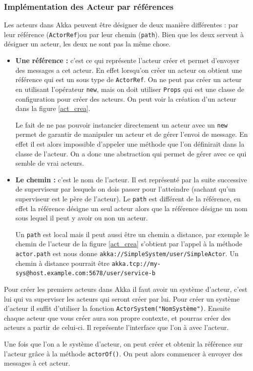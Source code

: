 \documentclass[11pt, a4paper]{article}
\begin{document}
\subsubsection{Implémentation des Acteur par références}
Les acteurs dans Akka peuvent être désigner de deux manière différentes : par leur référence (\texttt{ActorRef})ou par leur chemin (\texttt{path}). Bien que les deux servent à désigner un acteur, les deux ne sont pas la même chose. 
\begin{itemize}
\item \textbf{Une référence :} c'est ce qui représente l'acteur créer et permet d'envoyer des messages a cet acteur. En effet lorsqu'on créer un acteur on obtient une référence qui est un sous type de \texttt{ActorRef}. On ne peut pas créer un acteur en utilisant l'opérateur \texttt{new}, mais on doit utiliser \texttt{Props} qui est une classe de configuration pour créer des acteurs. On peut voir la création d'un acteur dans la figure \ref{act_crea}.
\par Le fait de ne pas pouvoir instancier directement un acteur avec un \texttt{new} permet de garantir de manipuler un acteur et de gérer l'envoi de message. En effet il est alors impossible d'appeler une méthode que l'on définirait dans la classe de l'acteur. On a donc une abstraction qui permet de gérer avec ce qui semble de vrai acteurs. 
\item \textbf{Le chemin :} c'est le nom de l'acteur. Il est représenté par la suite successive de superviseur par lesquels on dois passer pour l'atteindre (sachant qu'un superviseur est le père de l'acteur). Le \texttt{path} est différent de la référence, en effet la référence désigne un seul acteur alors que la référence désigne un nom sous lequel il peut y avoir ou non un acteur.
\par Un \texttt{path} est local mais il peut aussi être un chemin a distance, par exemple le chemin de l'acteur de la figure \ref{act_crea} s'obtient par l'appel à la méthode \texttt{actor.path} est nous donne \texttt{akka://SimpleSystem/user/SimpleActor}. Un chemin à distance pourrait être \texttt{akka.tcp://my-sys@host.example.com:5678/user/service-b}
\newline
\end{itemize}
\par 
Pour créer les premiers acteurs dans Akka il faut avoir un système d'acteur, c'est lui qui va superviser les acteurs qui seront créer par lui. Pour créer un système d'acteur il suffit d'utiliser la fonction \texttt{ActorSystem("NomSystème")}. Ensuite chaque acteur que vous créer aura son propre contexte, et pourras créer des acteurs a partir de celui-ci. Il représente l'interface que l'on à avec l'acteur. 
\par Une fois que l'on a le système d'acteur, on peut créer et obtenir la référence sur l'acteur grâce à la méthode \texttt{actorOf()}. On peut alors commencer à envoyer des messages à cet acteur.
\end{document}
